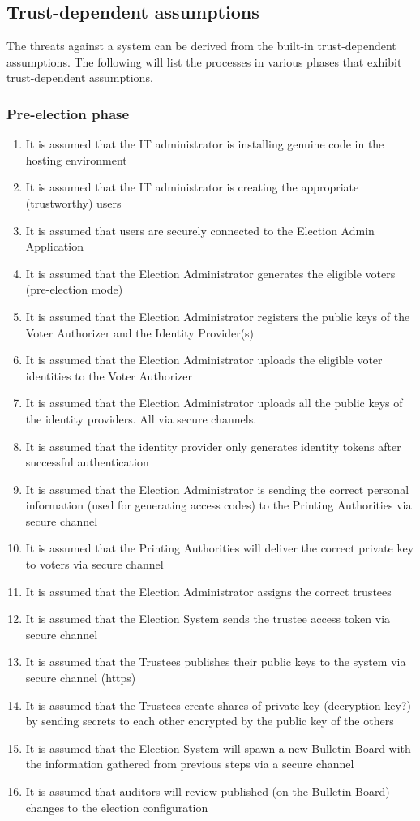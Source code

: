 \subsection{Trust-dependent assumptions} 
The threats against a system can be derived from the built-in trust-dependent assumptions. The following will list the processes in various phases that exhibit trust-dependent assumptions.


\subsubsection{Pre-election phase} 

\begin{enumerate}
\item It is assumed that the IT administrator is installing genuine code in the hosting environment
\item It is assumed that the IT administrator is creating the appropriate (trustworthy) users
\item It is assumed that users are securely connected to the Election Admin Application
\item It is assumed that the Election Administrator generates the eligible voters (pre-election mode)
\item It is assumed that the Election Administrator registers the public keys of the Voter Authorizer and the Identity Provider(s)
\item It is assumed that the Election Administrator uploads the eligible voter identities to the Voter Authorizer
\item It is assumed that the Election Administrator uploads all the public keys of the identity providers. All via secure channels.
\item It is assumed that the identity provider only generates identity tokens after successful authentication
\item It is assumed that the Election Administrator is sending the correct personal information (used for generating access codes) to the Printing Authorities via secure channel
\item It is assumed that the Printing Authorities will deliver the correct private key to voters via secure channel
\item It is assumed that the Election Administrator assigns the correct trustees
\item It is assumed that the Election System sends the trustee access token via secure channel
\item It is assumed that the Trustees publishes their public keys to the system via secure channel (https)
\item It is assumed that the Trustees create shares of private key (decryption key?) by sending secrets to each other encrypted by the public key of the others
\item It is assumed that the Election System will spawn a new Bulletin Board with the information gathered from previous steps via a secure channel
\item It is assumed that auditors will review published (on the Bulletin Board) changes to the election configuration
\end{enumerate}


